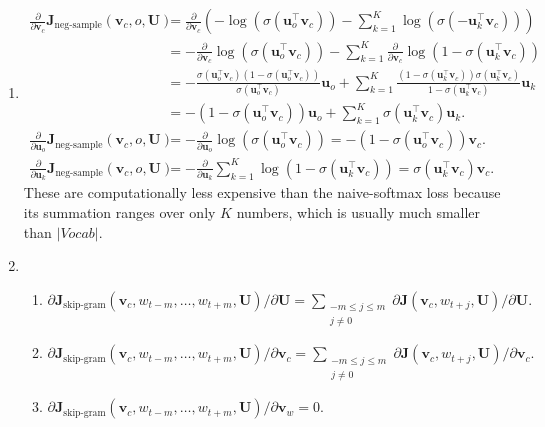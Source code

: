 \documentclass[12pt]{article}
\begin{document}
\begin{enumerate}[label=(\alph*)]
\item \begin{align*} \frac{\partial}{\partial\bm{v}_c}\bm{J}_{\textrm{neg-sample}}(\bm{v}_c,o,\bm{U}) &=\frac{\partial}{\partial\bm{v}_c}\left(-\log(\sigma(\bm{u}_o^\top\bm{v}_c))-\sum_{k=1}^K\log(\sigma(-\bm{u}_k^\top\bm{v}_c))\right) \\
&=-\frac{\partial}{\partial\bm{v}_c}\log(\sigma(\bm{u}_o^\top\bm{v}_c))-\sum_{k=1}^K\frac{\partial}{\partial\bm{v}_c}\log(1-\sigma(\bm{u}_k^\top\bm{v}_c)) \\
&=-\frac{\sigma(\bm{u}_o^\top\bm{v}_c)(1-\sigma(\bm{u}_o^\top\bm{v}_c))}{\sigma(\bm{u}_o^\top\bm{v}_c)}\bm{u}_o+\sum_{k=1}^K\frac{(1-\sigma(\bm{u}_k^\top\bm{v}_c))\sigma(\bm{u}_k^\top\bm{v}_c)}{1-\sigma(\bm{u}_k^\top\bm{v}_c)}\bm{u}_k \\
&=-(1-\sigma(\bm{u}_o^\top\bm{v}_c))\bm{u}_o+\sum_{k=1}^K\sigma(\bm{u}_k^\top\bm{v}_c)\bm{u}_k. \\
\frac{\partial}{\partial\bm{u}_o}\bm{J}_{\textrm{neg-sample}}(\bm{v}_c,o,\bm{U}) &=-\frac{\partial}{\partial\bm{u}_o}\log(\sigma(\bm{u}_o^\top\bm{v}_c))=-(1-\sigma(\bm{u}_o^\top\bm{v}_c))\bm{v}_c.\\
\frac{\partial}{\partial\bm{u}_k}\bm{J}_{\textrm{neg-sample}}(\bm{v}_c,o,\bm{U}) &=-\frac{\partial}{\partial\bm{u}_k}\sum_{k=1}^K\log(1-\sigma(\bm{u}_k^\top\bm{v}_c))=\sigma(\bm{u}_k^\top\bm{v}_c)\bm{v}_c.
\end{align*}
These are computationally less expensive than the naive-softmax loss because its summation ranges over only $K$ numbers, which is usually much smaller than $|Vocab|$.
\item \begin{enumerate}[label=(\roman*)]
  \item $\partial\bm{J}_{\textrm{skip-gram}}(\bm{v}_c,w_{t-m},\ldots,w_{t+m},\bm{U})/\partial\bm{U}=\sum\limits_{\substack{-m\leq j\leq m\\j\neq 0}}\partial\bm{J}(\bm{v}_c,w_{t+j},\bm{U})/\partial\bm{U}.$
  \item $\partial\bm{J}_{\textrm{skip-gram}}(\bm{v}_c,w_{t-m},\ldots,w_{t+m},\bm{U})/\partial\bm{v}_c=\sum\limits_{\substack{-m\leq j\leq m\\j\neq 0}}\partial\bm{J}(\bm{v}_c,w_{t+j},\bm{U})/\partial\bm{v}_c.$
  \item $\partial\bm{J}_{\textrm{skip-gram}}(\bm{v}_c,w_{t-m},\ldots,w_{t+m},\bm{U})/\partial\bm{v}_w=0.$
\end{enumerate}
\end{enumerate}
\end{document}
